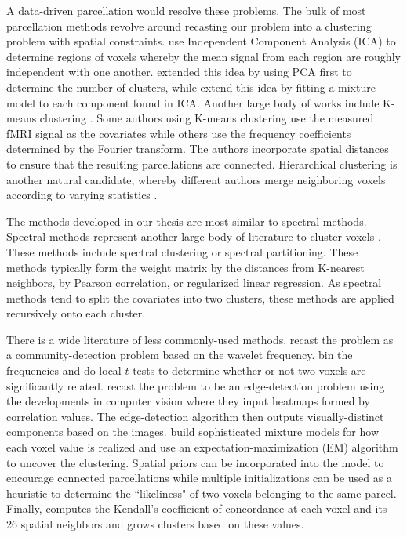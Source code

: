 {A data-driven parcellation would resolve these problems. 
The bulk of most parcellation methods revolve around recasting our problem into
a clustering problem with spatial constraints. \cite{biswal2010toward,smith2009correspondence}
use Independent Component Analysis (ICA) to determine regions of voxels whereby the 
mean signal from each region are roughly independent with one another. \cite{chen2008group} 
extended this idea by using PCA first to determine the number of clusters, while
\cite{beckmann2005investigations, de2006fmri} extend this idea by fitting
a mixture model to each component found in ICA. Another large
body of works include K-means clustering \citep{flandin2002parcellation,mezer2009cluster,peltier2003detecting,thirion2006dealing}.
Some authors using K-means clustering use the measured fMRI signal as the covariates while
others use the frequency coefficients determined by the Fourier transform. The authors
incorporate spatial distances to ensure that the resulting parcellations are connected.
Hierarchical clustering is another natural candidate, whereby different authors merge
neighboring voxels according to varying statistics \citep{diez2014novel,bellec2006identification,lu2003region,heller2006cluster}.

The methods developed in our thesis are most similar to
spectral methods. Spectral methods represent another large body of literature to cluster voxels
\citep{craddock2012whole,van2008normalized,shen2010graph,newman2006modularity,shen2013groupwise,zhang2014robust}.
These methods include spectral clustering or spectral partitioning. These methods typically
form the weight matrix by the distances from K-nearest neighbors, by Pearson correlation,
or regularized linear regression. As spectral methods tend to split the covariates into
two clusters, these methods are applied recursively onto each cluster. 

There is a wide literature of less commonly-used methods. \cite{alexander2012discovery} recast
the problem as a community-detection problem based on the wavelet frequency.
\cite{baria2011anatomical} bin the frequencies and do local $t$-tests to determine
whether or not two voxels are significantly related. \cite{cohen2008defining, gordon2014generation, barnes2011parcellation} recast the problem to be an edge-detection
problem using the developments in computer vision where they input heatmaps formed by
correlation values. The edge-detection algorithm then outputs visually-distinct components
based on the images. \cite{ryali2013parcellation,pohl2007hierarchical} build sophisticated
mixture models for how each voxel value is realized and use an expectation-maximization
(EM) algorithm to uncover the clustering. Spatial priors can be incorporated into the
model to encourage connected parcellations while multiple initializations can be used as
a heuristic to determine the ``likeliness" of two voxels belonging to the same parcel.
Finally, \cite{blumensath2013spatially} computes the Kendall's coefficient of concordance
at each voxel and its 26 spatial neighbors and grows clusters based on these values.
}

